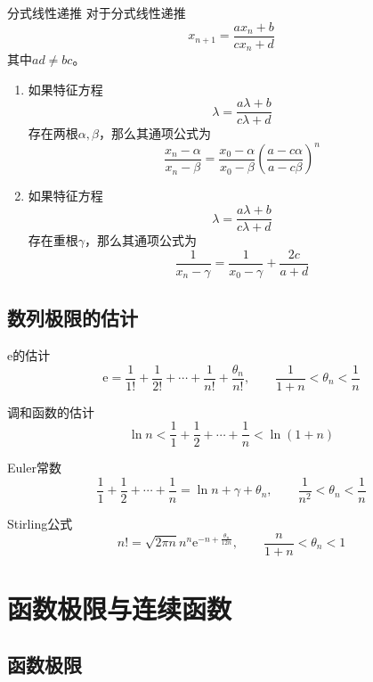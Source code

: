 \documentclass[lang = cn, scheme = chinese, thmcnt = section]{elegantbook}
\begin{document}
\begin{theorem}{分式线性递推}
	对于分式线性递推
	$$
	x_{n+1}=\frac{ax_n+b}{cx_n+d}
	$$
	其中$ad\ne bc$。
	\begin{enumerate}
		\item 如果特征方程
		$$
		\lambda=\frac{a\lambda+b}{c\lambda+d}
		$$
		存在两根$\alpha,\beta$，那么其通项公式为
		$$
		\frac{x_n-\alpha}{x_n-\beta}=
		\frac{x_0-\alpha}{x_0-\beta}\left(\frac{a-c\alpha}{a-c\beta}\right)^n
		$$
		\item 如果特征方程
		$$
		\lambda=\frac{a\lambda+b}{c\lambda+d}
		$$
		存在重根$\gamma$，那么其通项公式为
		$$
		\frac{1}{x_n-\gamma}=\frac{1}{x_0-\gamma}+\frac{2c}{a+d}
		$$
	\end{enumerate}
\end{theorem}

\section{数列极限的估计}

\begin{proposition}{$\text{e}$的估计}
	$$
	\text{e}=\frac{1}{1!}+\frac{1}{2!}+\cdots+\frac{1}{n!}+\frac{\theta_n}{n!},\qquad \frac{1}{1+n}<\theta_n<\frac{1}{n}
	$$
\end{proposition}

\begin{proposition}{调和函数的估计}
	$$
	\ln n<\frac{1}{1}+\frac{1}{2}+\cdots+\frac{1}{n}<\ln(1+n)
	$$
\end{proposition}

\begin{proposition}{Euler常数}
	$$
	\frac{1}{1}+\frac{1}{2}+\cdots+\frac{1}{n}=\ln n+\gamma+\theta_n,\qquad 
	\frac{1}{n^2}<\theta_n<\frac{1}{n}
	$$
\end{proposition}

\begin{theorem}{Stirling公式}
	$$
	n!=\sqrt{2\pi n}n^n\mathrm{e}^{-n+\frac{\theta_n}{12n}},\qquad 
	\frac{n}{1+n}<\theta_n<1
	$$
\end{theorem}

\chapter{函数极限与连续函数}

\section{函数极限}
\end{document}
